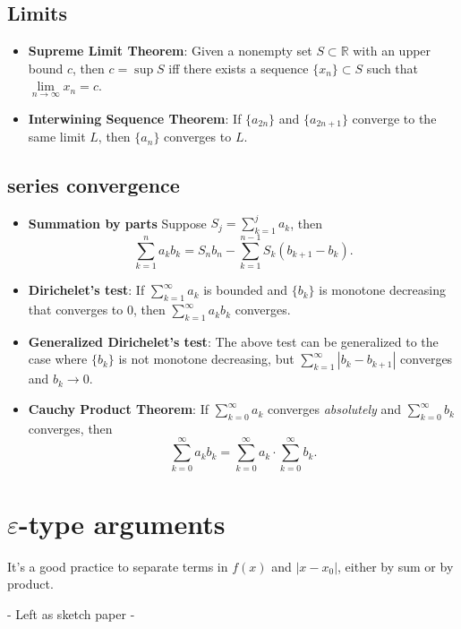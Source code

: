 \documentclass[a4paper,10pt]{article}
\newcommand{\R}{\mathbb{R}}
\begin{document}
\subsection{Limits}
\begin{itemize}
    \item \textbf{Supreme Limit Theorem}: Given a nonempty set $S\subset\R$ with an upper bound $c$, then $c=\sup S$
    iff there exists a sequence $\{x_n\}\subset S$ such that $\lim\limits_{n\to\infty}x_n=c$.
    \item \textbf{Interwining Sequence Theorem}: If $\{a_{2n}\}$ and $\{a_{2n+1}\}$ converge to the same limit $L$, then $\{a_n\}$ converges to $L$.
\end{itemize}

\subsection{series convergence}
\begin{itemize}
    \item \textbf{Summation by parts} Suppose $S_j=\sum_{k=1}^{j}a_k$, then\[
        \sum_{k=1}^{n}a_kb_k = S_n b_n - \sum_{k=1}^{n-1}S_k(b_{k+1}-b_k).
    \]
    \item \textbf{Dirichelet's test}: If $\sum_{k=1}^{\infty}a_k$ is bounded and $\{b_k\}$ is monotone decreasing that converges to $0$, then $\sum_{k=1}^{\infty}a_kb_k$ converges.
    \item \textbf{Generalized Dirichelet's test}: The above test can be generalized to the case where $\{b_k\}$ is not monotone decreasing, but $\sum_{k=1}^{\infty}|b_k-b_{k+1}|$ converges and $b_k\to0$.
    \item \textbf{Cauchy Product Theorem}: If $\sum_{k=0}^{\infty}a_k$ converges \textit{absolutely} and $\sum_{k=0}^{\infty}b_k$ converges, then\[
        \sum_{k=0}^{\infty}a_k b_k = \sum_{k=0}^{\infty}a_k \cdot \sum_{k=0}^{\infty}b_k.
    \]
\end{itemize}

\newpage

\section{$\varepsilon$-type arguments}
It's a good practice to separate terms in $f(x)$ and $|x-x_0|$, either by sum or by product.
\begin{center}
    - Left as sketch paper -
\end{center}

\newpage
\end{document}
